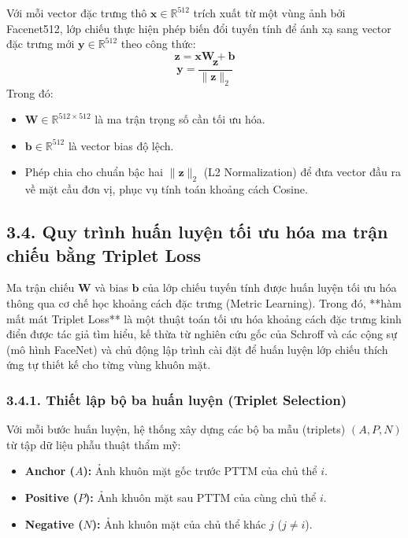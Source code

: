 Với mỗi vector đặc trưng thô $\bm{x} \in \mathbb{R}^{512}$ trích xuất từ một vùng ảnh bởi Facenet512, lớp chiếu thực hiện phép biến đổi tuyến tính để ánh xạ sang vector đặc trưng mới $\bm{y} \in \mathbb{R}^{512}$ theo công thức:
$$\bm{z} = \bm{x} \bm{W} + \bm{b}$$
$$\bm{y} = \frac{\bm{z}}{\|\bm{z}\|_2}$$
Trong đó:
\begin{itemize}
    \item $\bm{W} \in \mathbb{R}^{512 \times 512}$ là ma trận trọng số cần tối ưu hóa.
    \item $\bm{b} \in \mathbb{R}^{512}$ là vector bias độ lệch.
    \item Phép chia cho chuẩn bậc hai $\|\bm{z}\|_2$ (L2 Normalization) để đưa vector đầu ra về mặt cầu đơn vị, phục vụ tính toán khoảng cách Cosine.
\end{itemize}

\subsection*{3.4. Quy trình huấn luyện tối ưu hóa ma trận chiếu bằng Triplet Loss}

Ma trận chiếu $\bm{W}$ và bias $\bm{b}$ của lớp chiếu tuyến tính được huấn luyện tối ưu hóa thông qua cơ chế học khoảng cách đặc trưng (Metric Learning). Trong đó, **hàm mất mát Triplet Loss** là một thuật toán tối ưu hóa khoảng cách đặc trưng kinh điển được tác giả tìm hiểu, kế thừa từ nghiên cứu gốc của Schroff và các cộng sự (mô hình FaceNet) và chủ động lập trình cài đặt để huấn luyện lớp chiếu thích ứng tự thiết kế cho từng vùng khuôn mặt.

\subsubsection*{3.4.1. Thiết lập bộ ba huấn luyện (Triplet Selection)}
Với mỗi bước huấn luyện, hệ thống xây dựng các bộ ba mẫu (triplets) $(A, P, N)$ từ tập dữ liệu phẫu thuật thẩm mỹ:
\begin{itemize}
    \item \textbf{Anchor ($A$):} Ảnh khuôn mặt gốc trước PTTM của chủ thể $i$.
    \item \textbf{Positive ($P$):} Ảnh khuôn mặt sau PTTM của cùng chủ thể $i$.
    \item \textbf{Negative ($N$):} Ảnh khuôn mặt của chủ thể khác $j$ ($j \neq i$).
\end{itemize}

